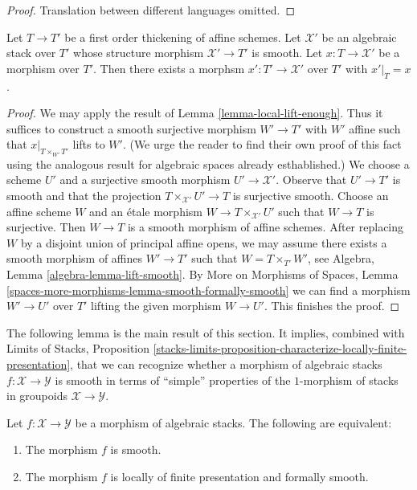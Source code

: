 \begin{proof}
Translation between different languages omitted.
\end{proof}

\begin{lemma}
\label{lemma-lift-to-smooth}
Let $T \to T'$ be a first order thickening of affine schemes.
Let $\mathcal{X}'$ be an algebraic stack over $T'$
whose structure morphism $\mathcal{X}' \to T'$ is smooth.
Let $x : T \to \mathcal{X}'$ be a morphism
over $T'$. Then there exists a morphsm $x' : T' \to \mathcal{X}'$
over $T'$ with $x'|_T = x$.
\end{lemma}

\begin{proof}
We may apply the result of Lemma \ref{lemma-local-lift-enough}.
Thus it suffices to construct a smooth surjective morphism
$W' \to T'$ with $W'$ affine such that
$x|_{T \times_{W'} T'}$ lifts to $W'$.
(We urge the reader to find their own proof of this fact
using the analogous result for algebraic spaces already
esthablished.) We choose a
scheme $U'$ and a surjective smooth morphism $U' \to \mathcal{X}'$.
Observe that $U' \to T'$ is smooth and that the projection
$T \times_{\mathcal{X}'} U' \to T$ is surjective smooth.
Choose an affine scheme $W$ and an \'etale morphism
$W \to T \times_{\mathcal{X}'} U'$ such that $W \to T$
is surjective. Then $W \to T$ is a smooth morphism of
affine schemes. After replacing $W$ by a disjoint union of
principal affine opens, we may assume there exists a
smooth morphism of affines $W' \to T'$ such that
$W = T \times_{T'} W'$, see Algebra, Lemma \ref{algebra-lemma-lift-smooth}.
By More on Morphisms of Spaces, Lemma
\ref{spaces-more-morphisms-lemma-smooth-formally-smooth}
we can find a morphism $W' \to U'$ over $T'$ lifting
the given morphism $W \to U'$. This finishes the proof.
\end{proof}

\noindent
The following lemma is the main result of this section.
It implies, combined with
Limits of Stacks, Proposition
\ref{stacks-limits-proposition-characterize-locally-finite-presentation},
that we can recognize whether a morphism of algebraic stacks
$f : \mathcal{X} \to \mathcal{Y}$ is smooth in terms of
``simple'' properties of the $1$-morphism of stacks in groupoids
$\mathcal{X} \to \mathcal{Y}$.

\begin{lemma}
\label{lemma-smooth-formally-smooth}
Let $f : \mathcal{X} \to \mathcal{Y}$ be a morphism of algebraic stacks.
The following are equivalent:
\begin{enumerate}
\item The morphism $f$ is smooth.
\item The morphism $f$ is locally of finite presentation and
formally smooth.
\end{enumerate}
\end{lemma}

